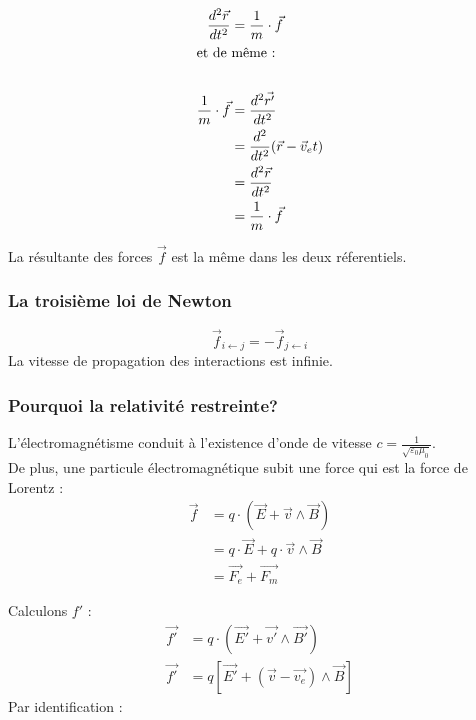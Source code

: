\documentclass{article}
\begin{document}
\begin{align*}
    \frac{d^2\vec{r}}{dt^2}   & = \frac{1}{m} \cdot \vec{f}               \\
    \intertext{et de même :}                                              \\
    \frac{1}{m} \cdot \vec{f} & = \frac{d^2\vec{r'}}{dt^2}                \\
                              & = \frac{d^2}{dt^2}(\vec{r} - \vec{v}_e t) \\
                              & = \frac{d^2\vec{r}}{dt^2}                 \\
                              & = \frac{1}{m} \cdot \vec{f}
\end{align*}

La résultante des forces $\vec{f}$ est la même dans les deux réferentiels.

\subsubsection{La troisième loi de Newton}
\begin{equation*}
    \vec{f}_{i\leftarrow j} = - \vec{f}_{j\leftarrow i}
\end{equation*}
La vitesse de propagation des interactions est infinie.\\


\subsubsection{Pourquoi la relativité restreinte?}
L'électromagnétisme conduit à l'existence d'onde de vitesse $c = \frac{1}{\sqrt{\varepsilon_0 \mu_0}}$.\\

De plus, une particule électromagnétique subit une force qui est la force de Lorentz :
\begin{align*}
    \vec{f} & = q \cdot (\vec{E} + \vec{v} \wedge \vec{B})       \\
            & = q \cdot \vec{E} + q \cdot \vec{v} \wedge \vec{B} \\
            & = \vec{F_e} + \vec{F_m}
\end{align*}

Calculons $f'$ :
\begin{align*}
    \vec{f'} & = q \cdot (\vec{E'} + \vec{v'} \wedge \vec{B'})  \\
    \vec{f'} & = q[\vec{E'}+ (\vec{v}-\vec{v_e})\wedge \vec{B}]
\end{align*}
Par identification : 
\begin{center}
\end{center}
\end{document}
